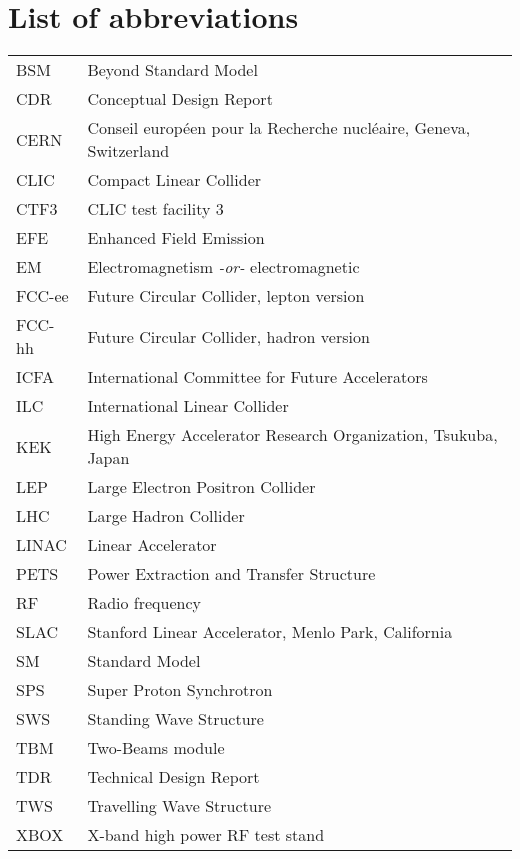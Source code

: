 \chapter*{List of abbreviations}

\begin{tabular}{l l}
BSM		&	Beyond Standard Model\\
CDR		&	Conceptual Design Report\\
CERN	&	Conseil europ\'een pour la Recherche nucl\'eaire, Geneva, Switzerland\\
CLIC		&	Compact Linear Collider\\
CTF3	&	CLIC test facility 3\\
EFE		&	Enhanced Field Emission\\
EM		&	Electromagnetism \textit{-or-} electromagnetic\\
FCC-ee	&	Future Circular Collider, lepton version\\
FCC-hh	&	Future Circular Collider, hadron version\\
ICFA		&	International Committee for Future Accelerators\\
ILC		&	International Linear Collider\\
KEK		&	High Energy Accelerator Research Organization, Tsukuba, Japan      \\  
LEP		&	Large Electron Positron Collider\\
LHC		&	Large Hadron Collider \\
LINAC	&	Linear Accelerator\\
PETS	&	Power Extraction and Transfer Structure\\
RF		&	Radio frequency\\
SLAC	&	Stanford Linear Accelerator, Menlo Park, California\\
SM		&	Standard Model\\
SPS		&	Super Proton Synchrotron\\
SWS		&	Standing Wave Structure\\
TBM		&	Two-Beams module\\
TDR		&	Technical Design Report\\
TWS		&	Travelling Wave Structure\\
XBOX	&	X-band high power RF test stand\\
\end{tabular}